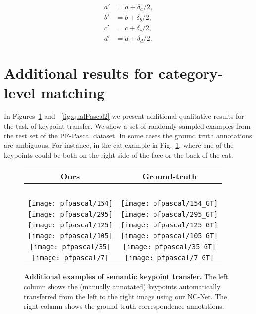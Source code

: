 \documentclass{article}
\begin{document}
\begin{equation}
\begin{split}
a'&=a+\delta_a/2,\\ 
b'&=b+\delta_b/2,\\
c'&=c+\delta_c/2,\\
d'&=d+\delta_d/2.    
\end{split}
\end{equation}


\section{Additional results for category-level matching\label{apx:cat_level}}
In Figures~\ref{fig:qualPascal} and ~\ref{fig:qualPascal2} we present additional qualitative results for the task of keypoint transfer. We show a set of randomly sampled examples from the test set of the PF-Pascal dataset. In some cases the ground truth annotations are ambiguous. For instance, in the cat example in Fig.~\ref{fig:qualPascal}, where one of the keypoints could be both on the right side of the face or the back of the cat.

\begin{figure}[tbp]
  \centering
  \begingroup
  \renewcommand{\arraystretch}{0.5}
  \begin{tabular}{@{\hskip 1pt}c@{\hskip 6pt}|@{\hskip 6pt}c@{\hskip 1pt}}
    Ours & Ground-truth \\ \hline
    ~ & ~ \\
\texttt{[image: pfpascal/154]}  & 
\texttt{[image: pfpascal/154\_GT]} \\
\texttt{[image: pfpascal/295]}  & 
\texttt{[image: pfpascal/295\_GT]} \\
\texttt{[image: pfpascal/125]}  & 
\texttt{[image: pfpascal/125\_GT]} \\
\texttt{[image: pfpascal/105]}  & 
\texttt{[image: pfpascal/105\_GT]} \\
\texttt{[image: pfpascal/35]}  & 
\texttt{[image: pfpascal/35\_GT]} \\
\texttt{[image: pfpascal/7]}  & 
\texttt{[image: pfpascal/7\_GT]} \\


  \end{tabular}
  \endgroup
  \vspace{2pt}
  \caption{{\bf Additional examples of semantic  keypoint  transfer.} The left column shows the (manually annotated) keypoints automatically transferred from the left to the right image using our NC-Net. The right column shows the ground-truth correspondence annotations.}
  \label{fig:qualPascal}
\end{figure}
\end{document}
